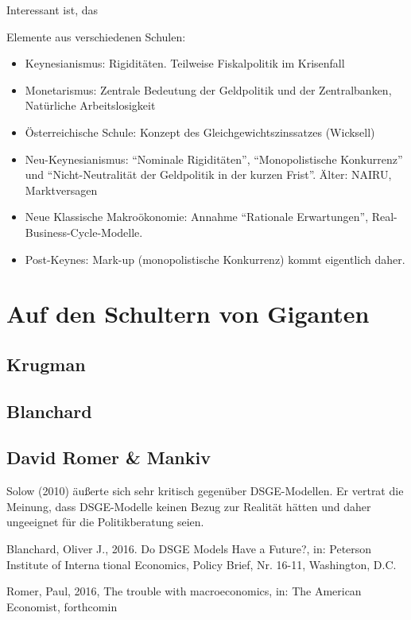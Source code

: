Interessant ist, das

Elemente aus verschiedenen Schulen:
\begin{itemize}
	\item Keynesianismus: Rigiditäten. Teilweise Fiskalpolitik im Krisenfall
	\item Monetarismus: Zentrale Bedeutung der Geldpolitik und der Zentralbanken, Natürliche Arbeitslosigkeit
	\item Österreichische Schule: Konzept des Gleichgewichtszinssatzes (Wicksell)
	\item Neu-Keynesianismus: "`Nominale Rigiditäten"', "`Monopolistische Konkurrenz"' und "`Nicht-Neutralität der Geldpolitik in der kurzen Frist"'. Älter: NAIRU, Marktversagen
	\item Neue Klassische Makroökonomie: Annahme "`Rationale Erwartungen"', Real-Business-Cycle-Modelle.
	\item Post-Keynes: Mark-up (monopolistische Konkurrenz) kommt eigentlich daher.
\end{itemize}





\section{Auf den Schultern von Giganten}
\label{Giganten}

\subsection{Krugman}

\subsection{Blanchard}

\subsection{David Romer \& Mankiv}





Solow (2010) äußerte sich sehr kritisch gegenüber DSGE-Modellen. Er vertrat die Meinung, dass 
DSGE-Modelle keinen Bezug zur Realität hätten und daher ungeeignet für die Politikberatung 
seien.



Blanchard, Oliver J., 2016. Do DSGE Models Have a Future?, in: Peterson Institute of International Economics, Policy Brief, Nr. 16-11, Washington, D.C.

Romer, Paul, 2016, The trouble with macroeconomics, in: The American Economist, forthcomin










